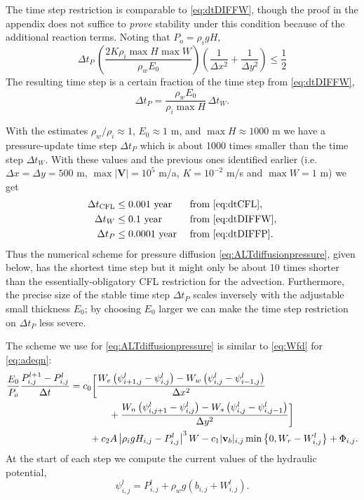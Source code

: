 \documentclass[12pt,final]{amsart}%
\newcommand\bv{\mathbf{v}}
\newcommand\bV{\mathbf{V}}
\newcommand{\Wlij}{W^l_{i,j}}
\newcommand{\Plij}{P^l_{i,j}}
\begin{document}
The time step restriction is comparable to \eqref{eq:dtDIFFW}, though the proof in the appendix does not suffice to \emph{prove} stability under this condition because of the additional reaction terms.  Noting that $P_o=\rho_i g H$,
\begin{equation}
\Delta t_P\, \left(\frac{2 K \rho_i \max H \max W}{\rho_w E_0}\right) \left(\frac{1}{\Delta x^2} + \frac{1}{\Delta y^2}\right) \le \frac{1}{2} \label{eq:dtDIFFP}
\end{equation}
The resulting time step is a certain fraction of the time step from \eqref{eq:dtDIFFW},
\begin{equation}
\Delta t_P = \frac{\rho_w E_0}{\rho_i \max H}\, \Delta t_W.
\end{equation}

With the estimates $\rho_w/\rho_i \approx 1$, $E_0\approx 1$ m, and $\max H \approx 1000$ m we have a pressure-update time step $\Delta t_P$ which is about 1000 times smaller than the time step $\Delta t_W$.  With these values and the previous ones identified earlier (i.e.~$\Delta x = \Delta y = 500$ m, $\max |\bV|=10^5$ m/a, $K=10^{-2}$ m/s and $\max W=1$ m) we get
\begin{align*}
  \Delta t_{\text{CFL}} &\le 0.001  \text{ year} &&\text{ from \eqref{eq:dtCFL}}, \\
  \Delta t_W            &\le 0.1    \text{ year} &&\text{ from \eqref{eq:dtDIFFW}}, \\
  \Delta t_P            &\le 0.0001 \text{ year} &&\text{ from \eqref{eq:dtDIFFP}.}
\end{align*}
Thus the numerical scheme for pressure diffusion \eqref{eq:ALTdiffusionpressure}, given below, has the shortest time step but it might only be about 10 times shorter than the essentially-obligatory CFL restriction for the advection.  Furthermore, the precise size of the stable time step $\Delta t_P$ scales inversely with the adjustable small thickness $E_0$; by choosing $E_0$ larger we can make the time step restriction on $\Delta t_P$ less severe.

The scheme we use for \eqref{eq:ALTdiffusionpressure} is similar to \eqref{eq:Wfd} for \eqref{eq:adeqn}:
\begin{align}
\frac{E_0}{P_o} \frac{P_{i,j}^{l+1} - \Plij}{\Delta t} &= c_0 \bigg[\frac{W_e \left(\psi_{i+1,j}^l - \psi_{i,j}^l\right) - W_w \left(\psi_{i,j}^l - \psi_{i-1,j}^l\right)}{\Delta x^2}  \label{eq:Pfd} \\
      &\qquad\qquad + \frac{W_n \left(\psi_{i,j+1}^l - \psi_{i,j}^l\right) - W_s \left(\psi_{i,j}^l - \psi_{i,j-1}^l\right)}{\Delta y^2}\bigg] \notag \\
      &\qquad + c_2 A \left|\rho_i g H_{i,j} - \Plij\right|^3 W - c_1 |\bv_b|_{i,j} \min\left\{0,W_r - \Wlij\right\} + \Phi_{i,j}. \notag
\end{align}
At the start of each step we compute the current values of the hydraulic potential,
	$$\psi_{i,j}^l = \Plij + \rho_w g(b_{i,j} + \Wlij).$$
\end{document}
